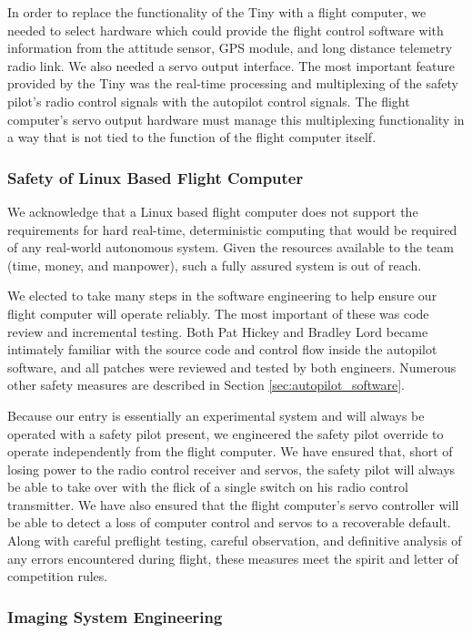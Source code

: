 \documentclass[pdftex,10pt,letter]{article}
\begin{document}
In order to replace the functionality of the Tiny with a flight computer, we needed to select hardware which could provide the flight control software with information from the attitude sensor, GPS module, and long distance telemetry radio link. We also needed a servo output interface. The most important feature provided by the Tiny was the real-time processing and multiplexing of the safety pilot's radio control signals with the autopilot control signals. The flight computer's servo output hardware must manage this multiplexing functionality in a way that is not tied to the function of the flight computer itself. 

\subsubsection{Safety of Linux Based Flight Computer}

We acknowledge that a Linux based flight computer does not support the requirements for hard real-time, deterministic computing that would be required of any real-world autonomous system. Given the resources available to the team (time, money, and manpower), such a fully assured system is out of reach.

We elected to take many steps in the software engineering to help ensure our flight computer will operate reliably. The most important of these was code review and incremental testing. Both Pat Hickey and Bradley Lord became intimately familiar with the source code and control flow inside the autopilot software, and all patches were reviewed and tested by both engineers. Numerous other safety measures are described in Section \ref{sec:autopilot_software}.

Because our entry is essentially an experimental system and will always be operated with a safety pilot present, we engineered the safety pilot override to operate independently from the flight computer. We have ensured that, short of losing power to the radio control receiver and servos, the safety pilot will always be able to take over with the flick of a single switch on his radio control transmitter. We have also ensured that the flight computer's servo controller will be able to detect a loss of computer control and servos to a recoverable default. Along with careful preflight testing, careful observation, and definitive analysis of any errors encountered during flight, these measures meet the spirit and letter of competition rules.

\subsubsection{Imaging System Engineering}
\end{document}
